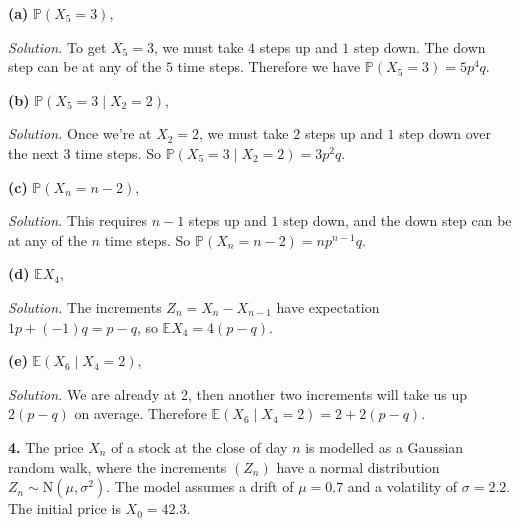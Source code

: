 \documentclass[
  a4paper,
]{article}
\theoremstyle{definition}
\theoremstyle{definition}
\theoremstyle{definition}
\theoremstyle{remark}
\begin{document}
\textbf{(a)} \(\mathbb P(X_5 = 3)\),

\begin{myanswers}

\emph{Solution.} To get \(X_5 = 3\), we must take \(4\) steps up and \(1\) step down. The down step can be at any of the \(5\) time steps. Therefore we have \(\mathbb P(X_5 = 3) = 5p^4q\).

\end{myanswers}

\textbf{(b)} \(\mathbb P(X_5 = 3 \mid X_2 = 2)\),

\begin{myanswers}

\emph{Solution.} Once we're at \(X_2 = 2\), we must take \(2\) steps up and \(1\) step down over the next \(3\) time steps. So \(\mathbb P(X_5 = 3 \mid X_2 = 2) = 3p^2q\).

\end{myanswers}

\textbf{(c)} \(\mathbb P(X_n = n-2)\),

\begin{myanswers}

\emph{Solution.} This requires \(n-1\) steps up and \(1\) step down, and the down step can be at any of the \(n\) time steps. So \(\mathbb P(X_n = n-2) = np^{n-1}q\).

\end{myanswers}

\textbf{(d)} \(\mathbb E X_4\),

\begin{myanswers}

\emph{Solution.} The increments \(Z_n = X_n - X_{n-1}\) have expectation \(1p + (-1)q = p - q\), so \(\mathbb E X_4 = 4(p-q)\).

\end{myanswers}

\textbf{(e)} \(\mathbb E(X_6 \mid X_4 = 2)\),

\begin{myanswers}

\emph{Solution.} We are already at 2, then another two increments will take us up \(2(p-q)\) on average. Therefore \(\mathbb E(X_6 \mid X_4 = 2) = 2 + 2(p-q)\).

\end{myanswers}

\textbf{4.} The price \(X_n\) of a stock at the close of day \(n\) is modelled as a Gaussian random walk, where the increments \((Z_n)\) have a normal distribution \(Z_n \sim \text{N}(\mu, \sigma^2)\). The model assumes a drift of \(\mu = 0.7\) and a volatility of \(\sigma = 2.2\). The initial price is \(X_0 = 42.3\).
\end{document}
